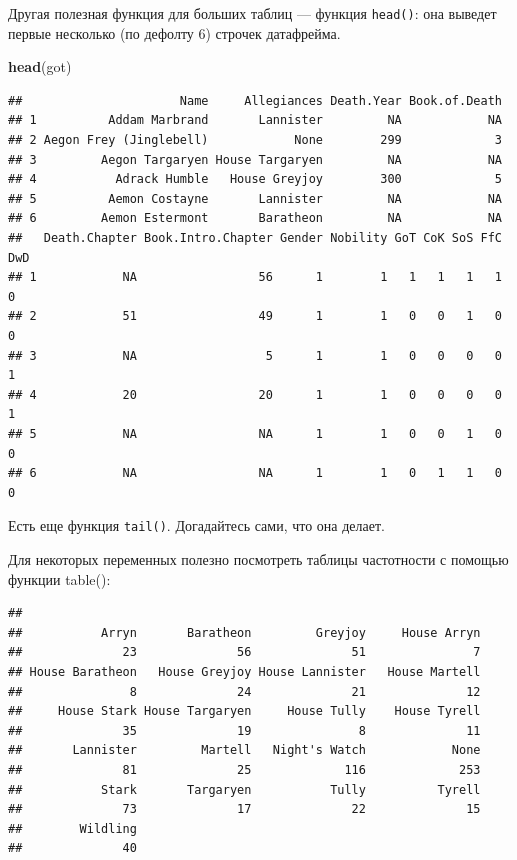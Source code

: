 \documentclass[]{book}
\newenvironment{Shaded}{\begin{snugshade}}{\end{snugshade}}
\newcommand{\KeywordTok}[1]{\textcolor[rgb]{0.13,0.29,0.53}{\textbf{#1}}}
\newcommand{\NormalTok}[1]{#1}
\newcommand{\OperatorTok}[1]{\textcolor[rgb]{0.81,0.36,0.00}{\textbf{#1}}}
\begin{document}
Другая полезная функция для больших таблиц --- функция \texttt{head()}: она выведет первые несколько (по дефолту 6) строчек датафрейма.

\begin{Shaded}
\begin{Highlighting}[]
\KeywordTok{head}\NormalTok{(got)}
\end{Highlighting}
\end{Shaded}

\begin{verbatim}
##                      Name     Allegiances Death.Year Book.of.Death
## 1          Addam Marbrand       Lannister         NA            NA
## 2 Aegon Frey (Jinglebell)            None        299             3
## 3         Aegon Targaryen House Targaryen         NA            NA
## 4           Adrack Humble   House Greyjoy        300             5
## 5          Aemon Costayne       Lannister         NA            NA
## 6         Aemon Estermont       Baratheon         NA            NA
##   Death.Chapter Book.Intro.Chapter Gender Nobility GoT CoK SoS FfC DwD
## 1            NA                 56      1        1   1   1   1   1   0
## 2            51                 49      1        1   0   0   1   0   0
## 3            NA                  5      1        1   0   0   0   0   1
## 4            20                 20      1        1   0   0   0   0   1
## 5            NA                 NA      1        1   0   0   1   0   0
## 6            NA                 NA      1        1   0   1   1   0   0
\end{verbatim}

Есть еще функция \texttt{tail()}. Догадайтесь сами, что она делает.

Для некоторых переменных полезно посмотреть таблицы частотности с помощью функции table():

\begin{Shaded}
\end{Shaded}

\begin{verbatim}
## 
##           Arryn       Baratheon         Greyjoy     House Arryn 
##              23              56              51               7 
## House Baratheon   House Greyjoy House Lannister   House Martell 
##               8              24              21              12 
##     House Stark House Targaryen     House Tully    House Tyrell 
##              35              19               8              11 
##       Lannister         Martell   Night's Watch            None 
##              81              25             116             253 
##           Stark       Targaryen           Tully          Tyrell 
##              73              17              22              15 
##        Wildling 
##              40
\end{verbatim}
\end{document}
